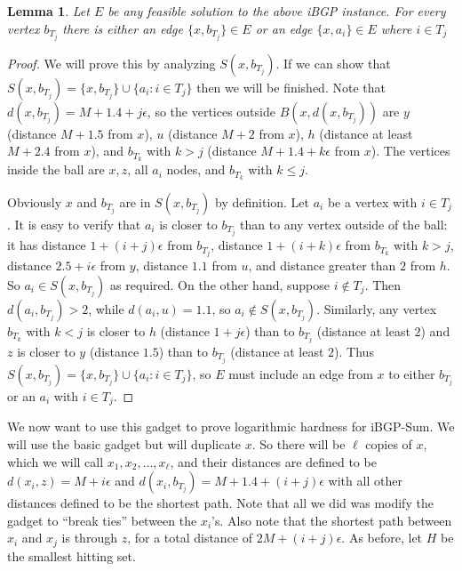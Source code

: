 \documentclass[11pt,letterpaper]{article}
\newtheorem{lemma}[theorem]{Lemma}
\theoremstyle{definition}
\newcounter{note}[section]
\begin{document}
\begin{lemma} \label{lem:gadget_necessary} Let $E$ be any feasible
  solution to the above iBGP instance.  For every vertex $b_{T_j}$
  there is either an edge $\{x, b_{T_j}\} \in E$ or an edge $\{x,
  a_i\} \in E$ where $i \in T_j$
\end{lemma}
\begin{proof}
  We will prove this by analyzing $S(x,b_{T_j})$.  If we can show that
  $S(x, b_{T_j}) = \{x, b_{T_j}\} \cup \{a_i : i \in T_j\}$ then we
  will be finished.  Note that $d(x, b_{T_j}) = M + 1.4 + j\epsilon$,
  so the vertices outside $B(x, d(x, b_{T_j}))$ are $y$ (distance
  $M+1.5$ from $x$), $u$ (distance $M+2$ from $x$), $h$ (distance at least
  $M+2.4$ from $x$), and $b_{T_k}$ with $k > j$ (distance
  $M+1.4+k\epsilon$ from $x$).  The vertices inside the ball are
  $x,z$, all $a_i$ nodes, and $b_{T_k}$ with $k \leq j$.

Obviously $x$ and $b_{T_j}$ are in $S(x, b_{T_j})$ by definition.  Let
$a_i$ be a vertex with $i \in T_j$.  It is easy to verify that $a_i$
is closer to $b_{T_j}$ than to any vertex outside of the ball: it has
distance $1+ (i+j)\epsilon$ from $b_{T_j}$, distance $1+(i+k)\epsilon$
from $b_{T_k}$ with $k > j$, distance $2.5 + i\epsilon$ from $y$,
distance $1.1$ from $u$, and distance greater than $2$ from $h$.  So
$a_i \in S(x, b_{T_j})$ as required.  On the other hand, suppose $i
\not\in T_j$.  Then $d(a_i, b_{T_j}) > 2$, while $d(a_i, u) = 1.1$, so
$a_i \not\in S(x, b_{T_j})$.  Similarly, any vertex $b_{T_k}$ with $k
< j$ is closer to $h$ (distance $1+j\epsilon$) than to $b_{T_j}$
(distance at least $2$) and $z$ is closer to $y$ (distance $1.5$) than
to $b_{T_j}$ (distance at least $2$).  Thus $S(x, b_{T_j}) = \{x,
b_{T_j}\} \cup \{a_i : i \in T_j\}$, so $E$ must include an edge from
$x$ to either $b_{T_j}$ or an $a_i$ with $i \in T_j$.
\end{proof}

We now want to use this gadget to prove logarithmic hardness for {\sc
  iBGP-Sum}.  We will use the basic gadget but will duplicate $x$.  So there
will be $\ell$ copies of $x$, which we will call $x_1, x_2, \dots,
x_{\ell}$, and their distances are defined to be $d(x_i, z) = M +
i\epsilon$ and $d(x_i, b_{T_j}) = M + 1.4 + (i+j)\epsilon$ with all
other distances defined to be the shortest path.  Note that all we did
was modify the gadget to ``break ties'' between the $x_i$'s.  Also
note that the shortest path between $x_i$ and $x_j$ is through $z$, for
a total distance of $2M + (i+j)\epsilon$.  As before, let $H$ be the
smallest hitting set.
\end{document}
